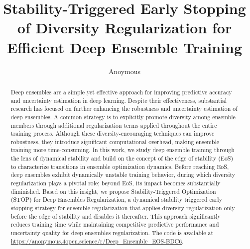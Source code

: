 \documentclass[sigconf]{acmart}
\begin{document}
\title{Stability-Triggered Early Stopping of Diversity Regularization for Efficient Deep Ensemble Training}

\author{Anoymous}




\begin{abstract}
Deep ensembles are a simple yet effective approach for improving predictive accuracy and uncertainty estimation in deep learning. Despite their effectiveness, substantial research has focused on further enhancing the robustness and uncertainty estimation of deep ensembles. A common strategy is to explicitly promote diversity among ensemble members through additional regularization terms applied throughout the entire training process. Although these diversity-encouraging techniques can improve robustness, they introduce significant computational overhead, making ensemble training more time-consuming.
In this work, we study deep ensemble training through the lens of dynamical stability and build on the concept of the edge of stability (EoS) to characterize transitions in ensemble optimization dynamics. Before reaching EoS, deep ensembles exhibit dynamically unstable training behavior, during which diversity regularization plays a pivotal role; beyond EoS, its impact becomes substantially diminished. Based on this insight, we propose Stability-Triggered Optimization (STOP) for Deep Ensembles Regularization, a dynamical stability triggered early stopping strategy for ensemble regularization that applies diversity regularization only before the edge of stability and disables it thereafter. This approach significantly reduces training time while maintaining competitive predictive performance and uncertainty quality for deep ensembles regularization. The code is available at 
\url{https://anonymous.4open.science/r/Deep_Ensemble_EOS-BDC6}.
\end{abstract}
\end{document}
